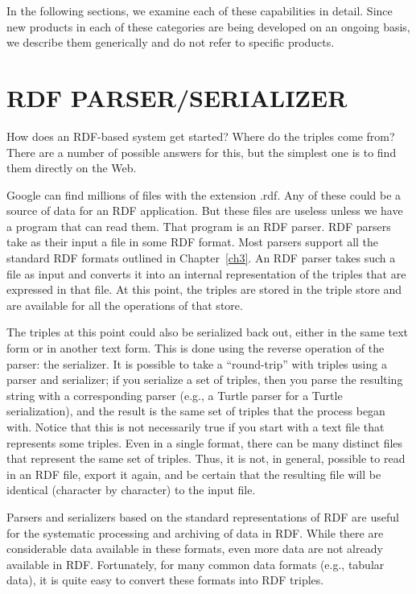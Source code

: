In the following sections, we examine each of these capabilities in
detail. Since new products in each of these categories are being
developed on an ongoing basis, we describe them generically and do not
refer to specific products.

\section{RDF PARSER/SERIALIZER}

How does an RDF-based system get started? Where do the triples come
from? There are a number of possible answers for this, but the simplest
one is to find them directly on the Web.

Google can find millions of files with the extension .rdf. Any of these
could be a source of data for an RDF application. But these files are
useless unless we have a program that can read them. That program is an
RDF parser. RDF parsers take as their input a file in some RDF format.
Most parsers support all the standard RDF formats outlined in Chapter~\ref{ch3}. 
An RDF parser takes such a file as input and converts it into an
internal representation of the triples that are expressed in that file.
At this point, the triples are stored in the triple store and are
available for all the operations of that store.

The triples at this point could also be serialized back out, either in
the same text form or in another text form. This is done using the
reverse operation of the parser: the serializer. It is possible to take
a ``round-trip'' with triples using a parser and serializer; if you
serialize a set of triples, then you parse the resulting string with a
corresponding parser (e.g., a Turtle parser for a Turtle serialization),
and the result is the same set of triples that the process began with.
Notice that this is not necessarily true if you start with a text file
that represents some triples. Even in a single format, there can be many
distinct files that represent the same set of triples. Thus, it is not,
in general, possible to read in an RDF file,
export it again, and be certain that the resulting file will be
identical (character by character) to the input file.

Parsers and serializers based on the standard representations of RDF are
useful for the systematic processing and archiving of data in RDF. While
there are considerable data available in these formats, even more data
are not already available in RDF. Fortunately, for many common data
formats (e.g., tabular data), it is quite easy to convert these formats
into RDF triples.


